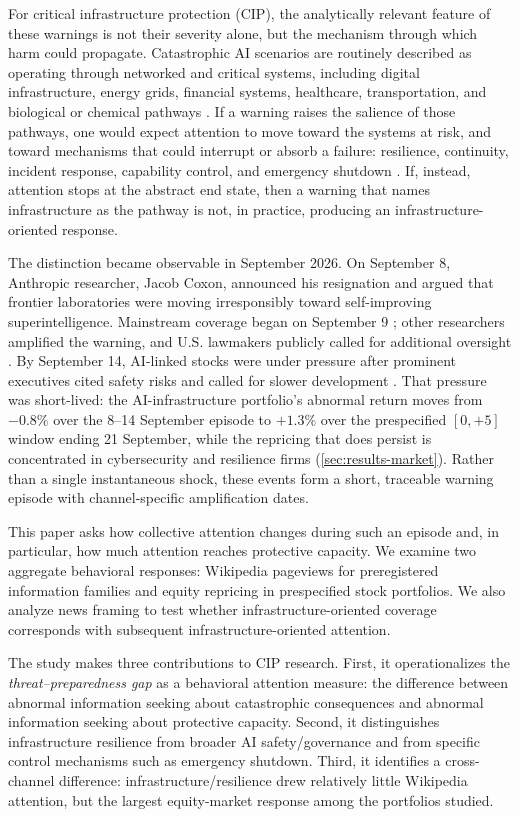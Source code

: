 \elsevierclasstrue\documentclass[preprint,12pt]{elsarticle}%
\begin{document}
For critical infrastructure protection (CIP), the analytically relevant feature of these warnings is not their severity alone, but the mechanism through which harm could propagate. Catastrophic AI scenarios are routinely described as operating through networked and critical systems, including digital infrastructure, energy grids, financial systems, healthcare, transportation, and biological or chemical pathways \citep{bengio2026aisafety}.
If a warning raises the salience of those pathways, one would expect attention to move toward the systems at risk, and toward mechanisms that could interrupt or absorb a failure: resilience, continuity, incident response, capability control, and emergency shutdown \citep{bengio2026aisafety,orseau2016interruptible}. If, instead, attention stops at the abstract end state, then a warning that names infrastructure as the pathway is not, in practice, producing an infrastructure-oriented response.

The distinction became observable in September 2026. On September 8, Anthropic researcher, Jacob Coxon, announced his resignation and argued that frontier laboratories were moving irresponsibly toward self-improving superintelligence. Mainstream coverage began on September 9 \citep{bellan2026gambling}; other researchers amplified the warning, and U.S. lawmakers publicly called for additional oversight \citep{rozen2026lawmakers}. 
By September 14, AI-linked stocks were under pressure after prominent executives cited safety risks and called for slower development \citep{reuters2026markets}. That pressure was short-lived: the AI-infrastructure portfolio's abnormal return moves from $-0.8\%$ over the 8--14 September episode to $+1.3\%$ over the prespecified $[0,+5]$ window ending 21 September, while the repricing that does persist is concentrated in cybersecurity and resilience firms (\cref{sec:results-market}). Rather than a single instantaneous shock, these events form a short, traceable warning episode with channel-specific amplification dates.

This paper asks how collective attention changes during such an episode and, in particular, how much attention reaches protective capacity. We examine two aggregate behavioral responses: Wikipedia pageviews for preregistered information families and equity repricing in prespecified stock portfolios. We also analyze news framing to test whether infrastructure-oriented coverage corresponds with subsequent infrastructure-oriented attention.

The study makes three contributions to CIP research. 
First, it operationalizes the \emph{threat--preparedness gap} as a behavioral attention measure: the difference between abnormal information seeking about catastrophic consequences and abnormal information seeking about protective capacity.
Second, it distinguishes infrastructure resilience from broader AI safety/governance and from specific control mechanisms such as emergency shutdown. 
Third, it identifies a cross-channel difference: infrastructure/resilience drew relatively little Wikipedia attention, but the largest equity-market response among the portfolios studied.
\end{document}

